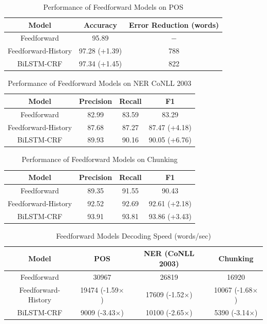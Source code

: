 \begin{table}[]
\centering
\caption{Performance of Feedforward Models on POS}
\label{table:ff-table1}
\begin{tabular}{|c|c|c|}
\hline
Model          & Accuracy       & Error Reduction (words)      \\ \hline
Feedforward    & 95.89          & $-$     \\ \hline
Feedforward-History & 97.28 (+1.39)    & 788 \\ \hline
BiLSTM-CRF & 97.34 (+1.45) & 822 \\ \hline
\end{tabular}
\end{table}

\begin{table}[]
\centering
\caption{Performance of Feedforward Models on NER CoNLL 2003}
\label{table:ff-table2}
\begin{tabular}{|c|c|c|c|}
\hline
Model          & Precision   & Recall   & F1 \\ \hline
Feedforward    & 82.99       & 83.59    & 83.29 \\ \hline
Feedforward-History & 87.68  & 87.27    & 87.47 (+4.18) \\ \hline
BiLSTM-CRF & 89.93 & 90.16 & 90.05 (+6.76) \\ \hline
\end{tabular}
\end{table}

\begin{table}[]
\centering
\caption{Performance of Feedforward Models on Chunking}
\label{table:ff-table3}
\begin{tabular}{|c|c|c|c|}
\hline
Model          & Precision   & Recall   & F1 \\ \hline
Feedforward    & 89.35       & 91.55    & 90.43 \\ \hline
Feedforward-History & 92.52  & 92.69    & 92.61 (+2.18) \\ \hline
BiLSTM-CRF & 93.91 & 93.81 & 93.86 (+3.43) \\ \hline
\end{tabular}
\end{table}

\begin{table}[]
\centering
\caption{Feedforward Models Decoding Speed (words/sec)}
\label{table:ff-tabel4}
\begin{tabular}{|c|c|c|c|}
\hline
Model       & POS & NER (CoNLL 2003) & Chunking     \\ \hline
Feedforward    & 30967     & 26819  &16920  \\ \hline
Feedforward-History & 19474 (-1.59$\times$) & 17609 (-1.52$\times$) & 10067 (-1.68$\times$)  \\ \hline
BiLSTM-CRF & 9009 (-3.43$\times$) & 10100 (-2.65$\times$) & 5390 (-3.14$\times$)\\ \hline
\end{tabular}
\end{table}


